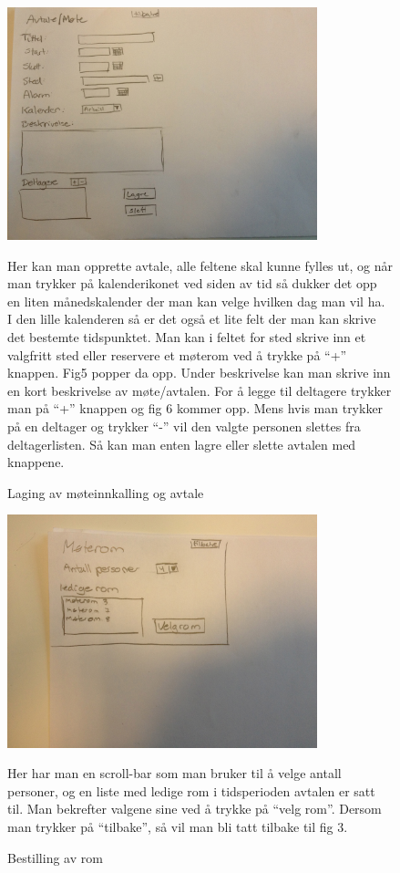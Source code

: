 \begin{figure}[ht!]
\includegraphics[width=90mm]{fig4.jpg}
\caption{Laging av møteinnkalling og avtale}
Her kan man opprette avtale, alle feltene skal kunne fylles ut, og når man trykker på kalenderikonet ved siden av tid så dukker det opp en liten månedskalender der man kan velge hvilken dag man vil ha. I den lille kalenderen så er det også et lite felt der man kan skrive det bestemte tidspunktet. Man kan i feltet for sted skrive inn et valgfritt sted eller reservere et møterom ved å trykke på “+” knappen. Fig5 popper da opp.
Under beskrivelse kan man skrive inn en kort beskrivelse av møte/avtalen. For å legge til deltagere trykker man på  “+” knappen og fig 6 kommer opp. Mens hvis man trykker på en deltager og trykker “-”  vil den valgte personen slettes fra deltagerlisten. Så kan man enten lagre eller slette avtalen med knappene. 
\end{figure}

\newpage


\begin{figure}[ht!]
\includegraphics[width=90mm]{fig5.jpg}
\caption{Bestilling av rom}
Her har man en scroll-bar som man bruker til å velge antall personer, og en liste med ledige rom i tidsperioden avtalen er satt til. Man bekrefter valgene sine ved å trykke på “velg rom”. Dersom man trykker på “tilbake”, så vil man bli tatt tilbake til fig 3.
\end{figure}

